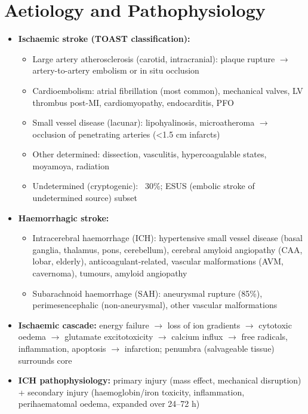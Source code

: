 \section*{Aetiology and Pathophysiology}
\begin{itemize}
    \item \textbf{Ischaemic stroke (TOAST classification):}
    \begin{itemize}
        \item Large artery atherosclerosis (carotid, intracranial): plaque rupture $\to$ artery-to-artery embolism or in situ occlusion
        \item Cardioembolism: atrial fibrillation (most common), mechanical valves, LV thrombus post-MI, cardiomyopathy, endocarditis, PFO
        \item Small vessel disease (lacunar): lipohyalinosis, microatheroma $\to$ occlusion of penetrating arteries (<1.5 cm infarcts)
        \item Other determined: dissection, vasculitis, hypercoagulable states, moyamoya, radiation
        \item Undetermined (cryptogenic): ~30\%; ESUS (embolic stroke of undetermined source) subset
    \end{itemize}
    \item \textbf{Haemorrhagic stroke:}
    \begin{itemize}
        \item Intracerebral haemorrhage (ICH): hypertensive small vessel disease (basal ganglia, thalamus, pons, cerebellum), cerebral amyloid angiopathy (CAA, lobar, elderly), anticoagulant-related, vascular malformations (AVM, cavernoma), tumours, amyloid angiopathy
        \item Subarachnoid haemorrhage (SAH): aneurysmal rupture (85\%), perimesencephalic (non-aneurysmal), other vascular malformations
    \end{itemize}
    \item \textbf{Ischaemic cascade:} energy failure $\to$ loss of ion gradients $\to$ cytotoxic oedema $\to$ glutamate excitotoxicity $\to$ calcium influx $\to$ free radicals, inflammation, apoptosis $\to$ infarction; penumbra (salvageable tissue) surrounds core
    \item \textbf{ICH pathophysiology:} primary injury (mass effect, mechanical disruption) + secondary injury (haemoglobin/iron toxicity, inflammation, perihaematomal oedema, expanded over 24--72 h)
\end{itemize}

